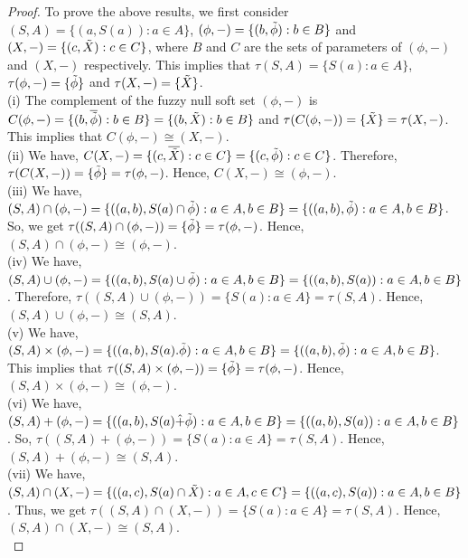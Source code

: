 \documentclass{article}
\theoremstyle{definition}
\begin{document}
\begin{proof}
 To prove the above results, we first consider 
$(S, A)=\{(a,S(a)): a\in A\}$, $(\phi, -)=\{(b,  \Tilde{\phi}): b\in B\}$ and $(X, -)=\{(c, \Tilde{X}): c\in C\}$, where $B$ and $C$ are the sets of parameters of $(\phi, -)$ and $(X, -)$ respectively. This implies that $\tau(S, A)=\{S(a):a \in A\}$, $\tau(\phi, -)=\{\Tilde{\phi} \}$ and $\tau(X, -)=\{\Tilde{X}\}$.\\


(i) The complement of the fuzzy null soft set $(\phi, -)$ is $C(\phi, -)=\{(b,  \overline{\Tilde{\phi}}): b\in B\}= \{(b, \Tilde{X}): b\in B\}$ and $\tau(C(\phi, -))=\{\Tilde{X}\}=\tau(X, -)$. This implies that $C(\phi, -) \cong (X, -)$.\\

(ii) We have, $C(X, -)=\{(c,  \overline{\Tilde{X}}): c\in C\}= \{(c, \Tilde{\phi}): c\in C\}$. Therefore, $\tau(C(X, -))=\{\Tilde{\phi}\}=\tau(\phi, -)$. Hence, $C(X, -) \cong (\phi, -)$. \\

(iii) We have, $(S, A)\cap (\phi, -)=\{((a, b), S(a)\cap \Tilde{\phi}) : a\in A, b\in B\}=\{((a,b), \Tilde{\phi}): a\in A, b\in B\}$. So, we get $\tau((S, A)\cap (\phi, -))=\{\Tilde{\phi} \}=\tau(\phi, -)$. Hence, $(S, A) \cap (\phi, -) \cong (\phi, -)$.\\

(iv) We have, $(S, A)\cup (\phi, -)=\{((a,b), S(a)\cup \Tilde{\phi}) : a\in A, b\in B\}=\{((a,b), S(a)): a\in A, b\in B\}$. Therefore, $\tau((S,A)\cup (\phi, -))=\{S(a): a\in A\}=\tau(S,A)$. Hence, $(S, A) \cup (\phi, -) \cong (S, A)$.\\

(v) We have, $(S,A) \times (\phi, -)=\{((a,b), S(a).\Tilde{\phi}) : a\in A, b\in B\}=\{((a,b), \Tilde{\phi}): a\in A, b\in B\} $. This implies that $\tau((S,A) \times (\phi, -))=\{\Tilde{\phi} \}=\tau(\phi, -)$. Hence, $(S, A) \times (\phi, -) \cong (\phi, -)$.\\

(vi) We have, $(S,A) + (\phi, -)=\{((a,b), S(a) \hat{+} \Tilde{\phi}) : a\in A, b\in B\}=\{((a,b), S(a)): a\in A, b\in B\}$. So, $\tau((S,A) + (\phi, -))=\{S(a): a\in A\}=\tau(S,A)$. Hence, $(S, A) + (\phi, -) \cong (S, A)$.\\

(vii) We have, $(S, A)\cap (X, -)=\{((a, c), S(a)\cap \Tilde{X}) : a\in A, c\in C\}=\{((a,c), S(a)): a\in A, b\in B\}$. Thus, we get $\tau((S, A)\cap (X, -))=\{S(a) : a\in A \}=\tau(S, A)$. Hence, $(S, A) \cap (X, -) \cong (S, A)$.\\



\end{proof}
\end{document}
